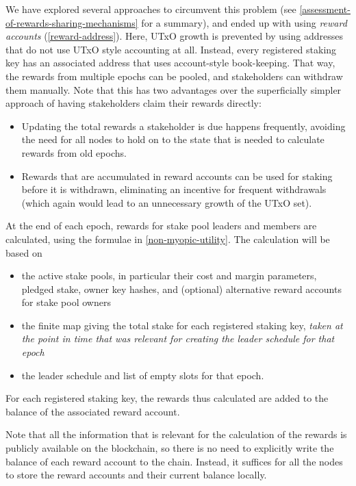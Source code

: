 \documentclass[11pt,a4paper]{article}
\begin{document}
We have explored several approaches to circumvent this problem
(see \cref{assessment-of-rewards-sharing-mechanisms} for a summary),
and ended up with using \emph{reward accounts}
(\cref{reward-address}). Here, UTxO growth is prevented by using
addresses that do not use UTxO style accounting at all. Instead, every
registered staking key has an associated address that uses
account-style book-keeping. That way, the rewards from multiple epochs
can be pooled, and stakeholders can withdraw them manually. Note that
this has two advantages over the superficially simpler approach of
having stakeholders claim their rewards directly:
\begin{itemize}
\item Updating the total rewards a stakeholder is due happens
  frequently, avoiding the need for all nodes to hold on to the state
  that is needed to calculate rewards from old epochs.
\item Rewards that are accumulated in reward accounts can be used for
  staking before it is withdrawn, eliminating an incentive for
  frequent withdrawals (which again would lead to an unnecessary
  growth of the UTxO set).
\end{itemize}

At the end of each epoch, rewards for stake pool leaders and members
are calculated, using the formulae in \cref{non-myopic-utility}. The
calculation will be based on
\begin{itemize}
\item the active stake pools, in particular their cost and margin
  parameters, pledged stake, owner key hashes, and (optional)
  alternative reward accounts for stake pool owners
\item the finite map giving the total stake for each registered
  staking key, \emph{taken at the point in time that was relevant for
    creating the leader schedule for that epoch}
\item the leader schedule and list of empty slots for that epoch.
\end{itemize}
For each registered staking key, the rewards thus calculated are added
to the balance of the associated reward account.

Note that all the information that is relevant for the calculation of
the rewards is publicly available on the blockchain, so there is no
need to explicitly write the balance of each reward account to the
chain. Instead, it suffices for all the nodes to store the reward
accounts and their current balance locally.
\end{document}
